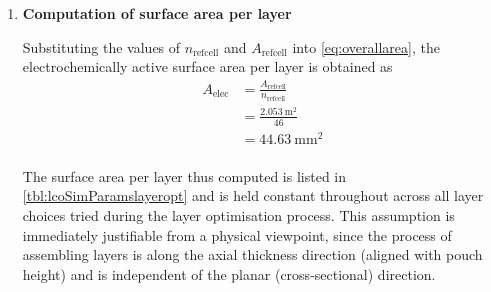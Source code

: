 \begin{enumerate}[ label=\textbf{\arabic*}), leftmargin=0pt, itemindent=20pt, labelwidth=15pt, labelsep=5pt, listparindent=0.7cm, align=left]
        Since fractional layers do not have  any physical meaning, the number of
        layers that  can be  accommodated within  any pouch  must be  an integer
        quantity. Therefore,  $n_\text{refcell}$ is  computed as the  `floor' of
        the quantity in the \gls{rhs} of \cref{eq:stackheightrefcellmod}
        \begin{align}
            n_\text{refcell} &= \floor*{\frac{L_\text{stack}}{l_\text{Al} + l_\text{pos} + l_\text{sep} + l_\text{neg} + l_\text{Cu}}} \\
            {} &= \floor*{\frac{9.68}{(15 +  72 + 25 + 88 + 10) \times 10^{-3}}} \\
            n_\text{refcell} &= 46
        \end{align}

        The reference cell is thus deemed to consist of 46~layers.

    \item \textbf{Computation of surface area per layer}

        Substituting  the values  of  $n_\text{refcell}$ and  $A_\text{refcell}$
        into  \cref{eq:overallarea}, the  electrochemically active  surface area
        per layer is obtained as
        \begin{align}
            A_\text{elec} & = \frac{A_\text{refcell}}{n_\text{refcell}} \\
            {}            & = \frac{\SI{2.053}{\meter\squared}}{46}     \\
            {}            & = \SI{44.63}{\milli\meter\squared}     \\
        \end{align}

        The   surface   area   per   layer    thus   computed   is   listed   in
        \cref{tbl:lcoSimParamslayeropt} and  is held constant  throughout across
        all  layer choices  tried during  the layer  optimisation process.  This
        assumption  is  immediately  justifiable   from  a  physical  viewpoint,
        since  the process  of assembling  layers is  along the  axial thickness
        direction (aligned with  pouch height) and is independent  of the planar
        (cross-sectional) direction.

\end{enumerate}



